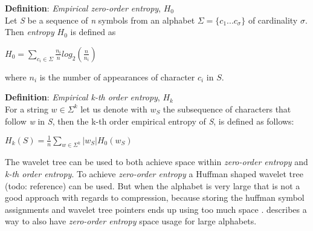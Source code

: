 \begin{mdframed}[nobreak, linecolor=lightgray]
\textbf{Definition}: \textit{Empirical zero-order entropy}, $H_0$ \\
Let \textit{S} be a sequence of \textit{n} symbols from an alphabet $\Sigma = \lbrace c_1 ... c_\sigma \rbrace$ of cardinality $\sigma$.
Then \textit{entropy} $H_0$ is defined as
\begin{center}
$H_0 = \sum\limits_{c_i \in \Sigma} \frac{n_i}{n} log_2(\frac{n}{n_i})$
\end{center}
where $n_i$ is the number of appearances of character $c_i$ in $S$.
\end{mdframed}

\begin{mdframed}[nobreak, linecolor=lightgray]
\textbf{Definition}: \textit{Empirical k-th order entropy}, $H_k$ \\
For a string $w \in \Sigma^k$ let us denote with $w_S$ the subsequence of characters that follow \textit{w} in \textit{S}, then the k-th order empirical entropy of \textit{S}, is defined as follows:
\begin{center}
$H_k(S) = \frac{1}{n} \sum\limits_{w \in \Sigma^k} | w_S |H_0(w_S)$
\end{center}
\end{mdframed}

The wavelet tree can be used to both achieve space within \textit{zero-order entropy} and \textit{k-th order entropy}. To achieve \textit{zero-order entropy} a Huffman shaped wavelet tree (todo: reference) can be used. But when the alphabet is very large that is not a good approach with regards to compression, because storing the huffman symbol assignments and wavelet tree pointers ends up using too much space . \citep[Section~3]{Claude08practicalrankselect} describes a way to also have \textit{zero-order entropy} space usage for large alphabets. 







